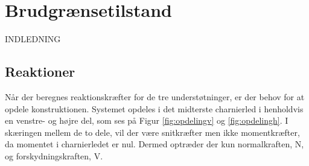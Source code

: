 \chapter{Brudgrænsetilstand}
INDLEDNING

\section{Reaktioner}
Når der beregnes reaktionskræfter for de tre understøtninger, er der behov for at opdele konstruktionen. Systemet opdeles i det midterste charnierled i henholdvis en venstre- og højre del, som ses på Figur \ref{fig:opdelingv} og \ref{fig:opdelingh}. I skæringen mellem de to dele, vil der være snitkræfter men ikke momentkræfter, da momentet i charnierledet er nul. Dermed optræder der kun normalkraften, N, og forskydningskraften, V.

